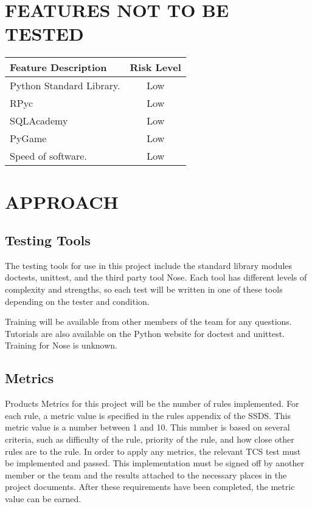 \documentclass[report]{article}
\begin{document}
\section[FEATURES NOT TO BE TESTED]{FEATURES NOT TO BE TESTED}
\begin{center}
\begin{tabularx}{\textwidth}{| X | c |}
  \hline
  \textbf{Feature Description} &
    \textbf{Risk Level} 
\\ \hline
 Python Standard Library. & Low
 \\ \hline
 RPyc & Low
 \\ \hline
 SQLAcademy & Low
 \\ \hline
 PyGame & Low
 \\ \hline
 Speed of software. & Low
\\ \hline
\end{tabularx}
\end{center}


\section[APPROACH]{APPROACH}
\subsection{Testing Tools}
The testing tools for use in this project include the standard library modules doctests, unittest, and the third party tool Nose. Each tool has different levels of complexity and strengths, so each test will be written in one of these tools depending on the tester and condition.

Training will be available from other members of the team for any questions. Tutorials are also available on the Python website for doctest and unittest. Training for Nose is unknown.

\subsection{Metrics}
Products Metrics for this project will be the number of rules implemented. For each rule, a metric value is specified in the rules appendix of the SSDS. This metric value is a number between 1 and 10. This number is based on several criteria, such as difficulty of the rule, priority of the rule, and how close other rules are to the rule. In order to apply any metrics, the relevant TCS test must be implemented and passed. This implementation must be signed off by another member or the team and the results attached to the necessary places in the project documents. After these requirements have been completed, the metric value can be earned.
\end{document}
